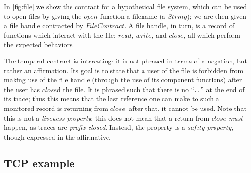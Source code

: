 \documentclass[preprint,onecolumn,9pt]{sigplanconf} %
\begin{document}
In \autoref{fig:file} we show the contract for a hypothetical file system, which can be used to open files by giving the $open$ function a filename (a $String$); we are then given a file handle contracted by $FileContract$.
%
A file handle, in turn, is a record of functions which interact with the file: $read$, $write$, and $close$, all which perform the expected behaviors.

The temporal contract is interesting: it is not phrased in terms of a negation, but rather an affirmation.
%
Its goal is to state that a user of the file is forbidden from making use of the file handle (through the use of its component functions) after the user has $close$d the file.
%
It is phrased such that there is no ``${\tt ...}$'' at the end of its trace; thus this means that the last reference one can make to such a monitored record is returning from $close$; after that, it cannot be used.
%
Note that this is not a \emph{liveness property}; this does not mean that a return from $close$ \emph{must} happen, as traces are \emph{prefix-closed}.
%
Instead, the property is a \emph{safety property}, though expressed in the affirmative.

\subsection{TCP example}
\end{document}
